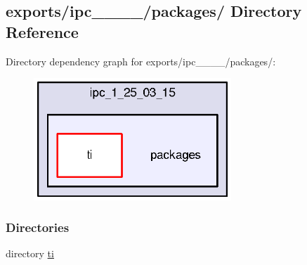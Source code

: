 \subsection{exports/ipc\-\_\-\_\-\_\-\_/packages/ Directory Reference}
\label{dir_f569b9b8dc21cdacb33a464cdae970fd}
Directory dependency graph for exports/ipc\-\_\-\_\-\_\-\_/packages/\-:
\nopagebreak
\begin{figure}[H]
\begin{center}
\leavevmode
\includegraphics[width=211pt]{dir_f569b9b8dc21cdacb33a464cdae970fd_dep}
\end{center}
\end{figure}
\subsubsection*{Directories}
\begin{DoxyCompactItemize}
\item 
directory \hyperlink{dir_3874edc6fe89abc7699a4e90a506e9bd}{ti}
\end{DoxyCompactItemize}
